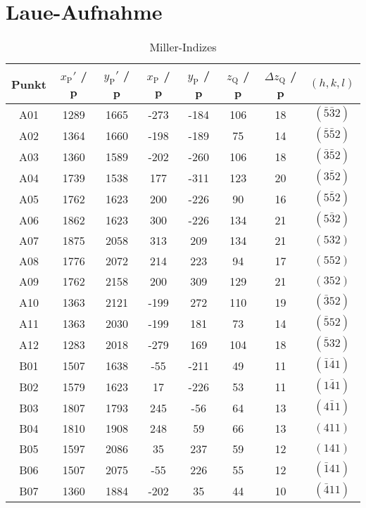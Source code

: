 \section{Laue-Aufnahme}\label{sec:laue}
\begin{table}[H]
    \centering
    \caption{Miller-Indizes}
    \begin{tabular}{c|c|c|c|c|c|c|c}
        Punkt & $x_{\mathrm{P}}'$ / p & $y_{\mathrm{P}}'$ / p & $x_{\mathrm{P}}$ / p & $y_{\mathrm{P}}$ / p & $z_{\mathrm{Q}}$ / p & $\Delta z_{\mathrm{Q}}$ / p & $(h,k,l)$ \\
        \hline
        A01 & 1289 & 1665 & -273 & -184 & 106 & 18 & $(\bar{5}\bar{3}2)$ \\
        A02 & 1364 & 1660 & -198 & -189 &  75 & 14 & $(\bar{5}\bar{5}2)$ \\
        A03 & 1360 & 1589 & -202 & -260 & 106 & 18 & $(\bar{3}\bar{5}2)$ \\
        A04 & 1739 & 1538 &  177 & -311 & 123 & 20 & $(3\bar{5}2)$ \\
        A05 & 1762 & 1623 &  200 & -226 &  90 & 16 & $(5\bar{5}2)$ \\
        A06 & 1862 & 1623 &  300 & -226 & 134 & 21 & $(5\bar{3}2)$ \\
        A07 & 1875 & 2058 &  313 &  209 & 134 & 21 & $(532)$ \\
        A08 & 1776 & 2072 &  214 &  223 &  94 & 17 & $(552)$ \\
        A09 & 1762 & 2158 &  200 &  309 & 129 & 21 & $(352)$ \\
        A10 & 1363 & 2121 & -199 &  272 & 110 & 19 & $(\bar{3}52)$ \\
        A11 & 1363 & 2030 & -199 &  181 &  73 & 14 & $(\bar{5}52)$ \\
        A12 & 1283 & 2018 & -279 &  169 & 104 & 18 & $(\bar{5}32)$ \\
        B01 & 1507 & 1638 &  -55 & -211 &  49 & 11 & $(\bar{1}\bar{4}1)$ \\
        B02 & 1579 & 1623 &   17 & -226 &  53 & 11 & $(1\bar{4}1)$ \\
        B03 & 1807 & 1793 &  245 &  -56 &  64 & 13 & $(4\bar{1}1)$ \\
        B04 & 1810 & 1908 &  248 &   59 &  66 & 13 & $(411)$ \\
        B05 & 1597 & 2086 &   35 &  237 &  59 & 12 & $(141)$ \\
        B06 & 1507 & 2075 &  -55 &  226 &  55 & 12 & $(\bar{1}41)$ \\
        B07 & 1360 & 1884 & -202 &   35 &  44 & 10 & $(\bar{4}11)$ \\

\end{tabular}
\end{table}
